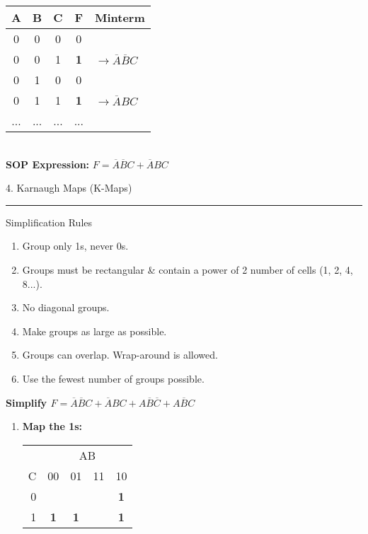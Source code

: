 \documentclass[a4paper, 8pt]{extarticle}
\newcommand{\sectionheading}[1]{%
  \par\vspace{0.7em}
  {\headingfont\fontsize{10.5pt}{11.5pt}\selectfont\color{black}#1}\par\nopagebreak
  \rule{\linewidth}{0.4pt}\vspace{0.2em}\nopagebreak
}
\newcommand{\subsectionheading}[1]{%
  \par\vspace{0.4em}\nopagebreak
  {\headingfont\fontsize{9pt}{10pt}\selectfont\color{black!80}#1}\par\nopagebreak\vspace{-0.3em}
}
\begin{document}
\begin{multicols}{3}
\begin{tcolorbox}[title=Deriving SOP from a Truth Table]
\renewcommand{\arraystretch}{1.2}
\begin{tabular}{ccc|c|l}
\textbf{A} & \textbf{B} & \textbf{C} & \textbf{F} & \textbf{Minterm} \\
\hline
0 & 0 & 0 & 0 & \\ \hline
0 & 0 & 1 & \textbf{1} & $\rightarrow \overline{A}\overline{B}C$ \\ \hline
0 & 1 & 0 & 0 & \\ \hline
0 & 1 & 1 & \textbf{1} & $\rightarrow \overline{A}BC$ \\ \hline
... & ... & ... & ... &
\end{tabular} \\
\vspace{0.5em}
\textbf{SOP Expression:} $F = \overline{A}\overline{B}C + \overline{A}BC$
\end{tcolorbox}

\sectionheading{4. Karnaugh Maps (K-Maps)}
\subsectionheading{Simplification Rules}
\begin{enumerate}
    \item Group only 1s, never 0s.
    \item Groups must be rectangular \& contain a power of 2 number of cells (1, 2, 4, 8...).
    \item No diagonal groups.
    \item Make groups as large as possible.
    \item Groups can overlap. Wrap-around is allowed.
    \item Use the fewest number of groups possible.
\end{enumerate}

\begin{tcolorbox}[title=3-Variable K-Map Example]
\textbf{Simplify $F = \overline{A}\overline{B}C + \overline{A}BC + A\overline{B}\overline{C} + A\overline{B}C$}
\begin{enumerate}
    \item \textbf{Map the 1s:}
    
    \begin{tabular}{r|c|c|c|c|}
      & \multicolumn{4}{c}{AB} \\
      \cline{2-5}
      C & 00 & 01 & 11 & 10 \\
      \cline{2-5}
      0 & & & & \textbf{1} \\
      \cline{2-5}
      1 & \textbf{1} & \textbf{1} & & \textbf{1} \\
      \cline{2-5}
    \end{tabular}
    

\end{enumerate}
\end{tcolorbox}
\end{multicols}
\end{document}
